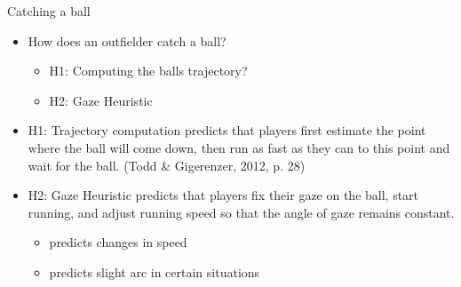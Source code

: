 \documentclass[
  ignorenonframetext,
]{beamer}
\providecommand{\tightlist}{%
  \setlength{\itemsep}{0pt}\setlength{\parskip}{0pt}}\usepackage{longtable,booktabs,array}
\begin{document}
\begin{frame}{Catching a ball}
\protect\hypertarget{catching-a-ball}{}
\begin{itemize}
\item
  How does an outfielder catch a ball?

  \begin{itemize}
  \tightlist
  \item
    H1: Computing the balls trajectory?
  \item
    H2: Gaze Heuristic
  \end{itemize}
\item
  H1: Trajectory computation predicts that players first estimate the
  point where the ball will come down, then run as fast as they can to
  this point and wait for the ball. (Todd \& Gigerenzer, 2012, p. 28)
\item
  H2: Gaze Heuristic predicts that players fix their gaze on the ball,
  start running, and adjust running speed so that the angle of gaze
  remains constant.

  \begin{itemize}
  \tightlist
  \item
    predicts changes in speed
  \item
    predicts slight arc in certain situations
  \end{itemize}
\end{itemize}
\end{frame}
\end{document}
